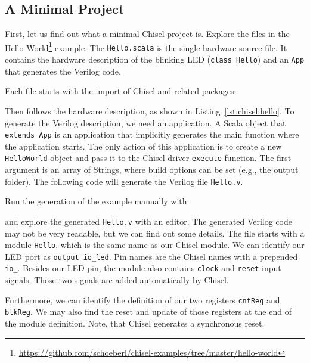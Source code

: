 \documentclass[%
    10pt,
    headinclude, footexclude,
    openright, %
    notitlepage,
    cleardoubleempty,
    headsepline,
    pointlessnumbers,
    bibtotoc, idxtotoc,
    ]{scrbook}
\newcommand{\code}[1]{{\small{\texttt{#1}}}}
\newcommand{\myref}[2]{\href{#1}{#2}}
\renewcommand{\myref}[2]{{#2}{\footnote{\url{#1}}}}
\begin{document}
\subsection{A Minimal Project}

First, let us find out what a minimal Chisel project is. Explore the files in the
\myref{https://github.com/schoeberl/chisel-examples/tree/master/hello-world}{Hello World}
example.
The \code{Hello.scala} is the single hardware source file.
It contains the hardware description of the blinking LED (\code{class Hello})
and an \code{App} that generates the Verilog code.

Each file starts with the import of Chisel and related packages:


\noindent Then follows the hardware description, as shown in Listing~\ref{lst:chisel:hello}.
To generate the Verilog description, we need an application. A Scala object that \code{extends App}
is an application that implicitly generates the main function where the application starts.
The only action of this application is to create a new \code{HelloWorld} object and pass it
to the Chisel driver \code{execute} function. The first argument is an array of Strings,
where build options can be set (e.g., the output folder). The following code will
generate the Verilog file \code{Hello.v}.


\noindent Run the generation of the example manually with


and explore the generated \code{Hello.v} with an editor. The generated Verilog code may not be
very readable, but we can find out some details. The file starts with a module \code{Hello},
which is the same name as our Chisel module. We can identify our LED port as
\code{output io\_led}. Pin names are the Chisel names with a prepended \code{io\_}.
Besides our LED pin, the module also contains \code{clock} and \code{reset} input signals.
Those two signals are added automatically by Chisel.

Furthermore, we can identify the definition of our two registers \code{cntReg} and \code{blkReg}.
We may also find the reset and update of those registers at the end of the module definition.
Note, that Chisel generates a synchronous reset.
\end{document}
